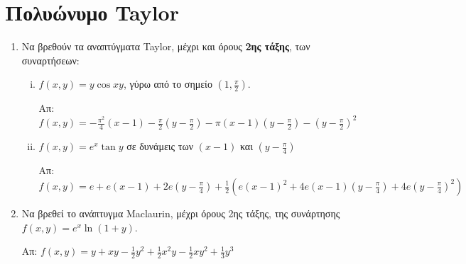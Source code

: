 \section*{Πολυώνυμο Taylor}

\begin{enumerate}
  \item Να βρεθούν τα αναπτύγματα Taylor, μέχρι και όρους 
    \textbf{2ης τάξης}, των συναρτήσεων:

    \begin{enumerate}[i)]
      \item  $f(x,y)=y\cos{xy} $, γύρω από το σημείο 
        $ \left(1, \frac{ \pi }{ 2 }\right) $.

        \hfill Απ: $f(x,y)=-\frac{\pi^{2}}{4}(x-1) - \frac{ \pi }{ 2 } 
        \left(y - \frac{ \pi }{2 }\right) - \pi(x-1)
        \left(y-\frac{\pi}{2}\right)- \left(y- \frac{ \pi }{ 2} \right)^{2} $

      \item $ f(x,y)=e^{x}\tan{y} $ σε δυνάμεις των $ (x-1) $ και 
        $ \left(y - \frac{ \pi }{ 4 }\right) $

        \hfill Απ: $ f(x,y) = e + e(x-1) + 2e\left(y- \frac{ \pi }{ 4 }\right)
        + \frac{1}{ 2 } \left(e(x-1)^{2}+4e(x-1)\left(y- \frac{ \pi }{ 4 }
        \right) + 4e\left(y- \frac{ \pi }{ 4 } \right)^{2}\right) $
    \end{enumerate}

  \item Να βρεθεί το ανάπτυγμα Maclaurin, μέχρι όρους 2ης τάξης, 
    της συνάρτησης $ f(x,y) = e^{x}\ln(1+y)$.

    \hfill Απ: $ f(x,y)=y + xy - \frac{1}{ 2 } y^{2} + \frac{1}{ 2 } x^{2}y - 
    \frac{1}{ 2 } xy^{2} + \frac{1}{ 3 } y^{3} $

\end{enumerate}

